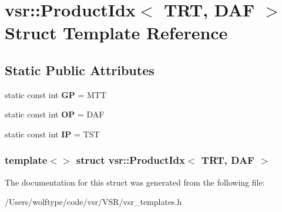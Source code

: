 \hypertarget{structvsr_1_1_product_idx_3_01_t_r_t_00_01_d_a_f_01_4}{\section{vsr\-:\-:Product\-Idx$<$ T\-R\-T, D\-A\-F $>$ Struct Template Reference}
\label{structvsr_1_1_product_idx_3_01_t_r_t_00_01_d_a_f_01_4}
}
\subsection*{Static Public Attributes}
\begin{DoxyCompactItemize}
\item 
\hypertarget{structvsr_1_1_product_idx_3_01_t_r_t_00_01_d_a_f_01_4_a98a4d4e59adafc7349c0d701c7564f25}{static const int {\bfseries G\-P} = M\-T\-T}\label{structvsr_1_1_product_idx_3_01_t_r_t_00_01_d_a_f_01_4_a98a4d4e59adafc7349c0d701c7564f25}

\item 
\hypertarget{structvsr_1_1_product_idx_3_01_t_r_t_00_01_d_a_f_01_4_aaa8c971de2ce235740ef00b3a1d5df92}{static const int {\bfseries O\-P} = D\-A\-F}\label{structvsr_1_1_product_idx_3_01_t_r_t_00_01_d_a_f_01_4_aaa8c971de2ce235740ef00b3a1d5df92}

\item 
\hypertarget{structvsr_1_1_product_idx_3_01_t_r_t_00_01_d_a_f_01_4_ad00f43a832d9aebdc70af96aede26ba8}{static const int {\bfseries I\-P} = T\-S\-T}\label{structvsr_1_1_product_idx_3_01_t_r_t_00_01_d_a_f_01_4_ad00f43a832d9aebdc70af96aede26ba8}

\end{DoxyCompactItemize}
\subsubsection*{template$<$$>$ struct vsr\-::\-Product\-Idx$<$ T\-R\-T, D\-A\-F $>$}



The documentation for this struct was generated from the following file\-:\begin{DoxyCompactItemize}
\item 
/\-Users/wolftype/code/vsr/\-V\-S\-R/vsr\-\_\-templates.\-h\end{DoxyCompactItemize}
